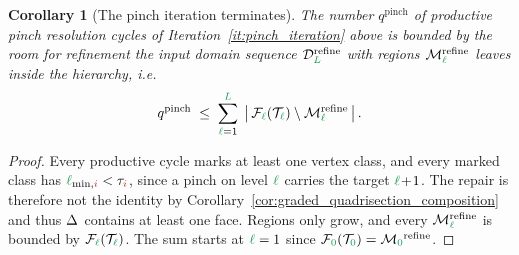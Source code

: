 \documentclass[a4paper, 12pt]{article}
\makeatletter
\newcommand{\lminIdx}[1]{\l_{\min,#1}}
\newcommand{\targetlevel}{\tau}                                 %
\newcommand{\green}{\color{ForestGreen}}
\newcommand{\brickred}{\color{BrickRed}}
\newcommand{\T}{\mathcal{T}}
\newcommand{\F}{\mathcal{F}}
\DeclareRobustCommand{\simplexsubsetTwo}[2][]{\Delta\ifx\@empty#1\@empty\else^{#1}\fi_{#2}}
\newcommand{\coarseIdxone}{{\brickred i}}
\renewcommand{\l}{{\green\ell}}
\renewcommand{\L}{{\green L}}
\newcommand{\lzero}{{\green 0}}
\newcommand{\M}{\mathcal{M}}
\newtheorem{corollary}[theorem]{Corollary}
\theoremstyle{definition}
\theoremstyle{plain}
\numberwithin{equation}{section}
\DeclareRobustCommand{\domseq}[1][]{\mathcal{D}\ifx\@empty#1\@empty\else_{#1}\fi}
\makeatother
\begin{document}
\begin{corollary}[The pinch iteration terminates]
    \label{cor:pinch_rounds}
    The number $q^{\mathrm{pinch}}$ of productive pinch resolution cycles of Iteration~\ref{it:pinch_iteration} above is bounded by the room for refinement the input domain sequence $\domseq[\L]^{\mathrm{refine}}$ with regions $\M^{\mathrm{refine}}_\l$ leaves inside the hierarchy, i.e.
    \begin{equation}
        \label{eq:pinch_rounds}
        q^{\mathrm{pinch}} \; \leq \; \sum\limits_{\l = 1}^{\L} \; \big\vert \, \F_\l(\T_\l) \setminus \M^{\mathrm{refine}}_\l \, \big\vert \, .
    \end{equation}
\end{corollary}
\begin{proof}
    Every productive cycle marks at least one vertex class, and every marked class has $\lminIdx{\coarseIdxone} < \targetlevel_\coarseIdxone$, since a pinch on level $\l$ carries the target $\l \! + \! 1$. The repair is therefore not the identity by Corollary~\ref{cor:graded_quadrisection_composition} and thus $\simplexsubsetTwo{}$ contains at least one face. Regions only grow, and every $\M^{\mathrm{refine}}_\l$ is bounded by $\F_\l(\T_\l)$. The sum starts at $\l = 1$ since $\F_\lzero(\T_{\lzero}) = \M_\lzero^{\mathrm{refine}}$.
\end{proof}
\end{document}

